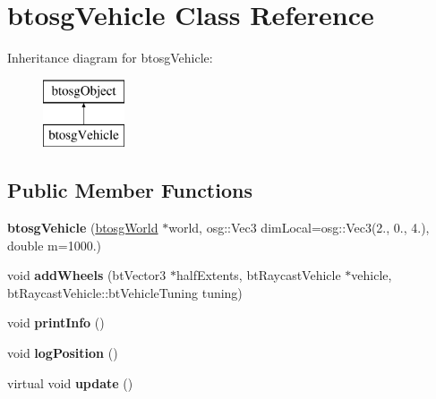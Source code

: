 \hypertarget{classbtosgVehicle}{}\section{btosg\+Vehicle Class Reference}
\label{classbtosgVehicle}
Inheritance diagram for btosg\+Vehicle\+:\begin{figure}[H]
\begin{center}
\leavevmode
\includegraphics[height=2.000000cm]{classbtosgVehicle}
\end{center}
\end{figure}
\subsection*{Public Member Functions}
\begin{DoxyCompactItemize}
\item 
\mbox{\label{classbtosgVehicle_a462222cde5a3480b8964b582fcbf39a3}} 
{\bfseries btosg\+Vehicle} (\hyperlink{classbtosgWorld}{btosg\+World} $\ast$world, osg\+::\+Vec3 dim\+Local=osg\+::\+Vec3(2., 0., 4.), double m=1000.)
\item 
\mbox{\label{classbtosgVehicle_a98971fb952c08cb72341a0c333fc66de}} 
void {\bfseries add\+Wheels} (bt\+Vector3 $\ast$half\+Extents, bt\+Raycast\+Vehicle $\ast$vehicle, bt\+Raycast\+Vehicle\+::bt\+Vehicle\+Tuning tuning)
\item 
\mbox{\label{classbtosgVehicle_abe98f64f0a8f37c7c0b244e3afbbcb15}} 
void {\bfseries print\+Info} ()
\item 
\mbox{\label{classbtosgVehicle_ae9168c62263b26f95d068d94d6a7cab7}} 
void {\bfseries log\+Position} ()
\item 
\mbox{\label{classbtosgVehicle_a5fd0f471df492ac232c9b772a28bd2b9}} 
virtual void {\bfseries update} ()
\end{DoxyCompactItemize}
